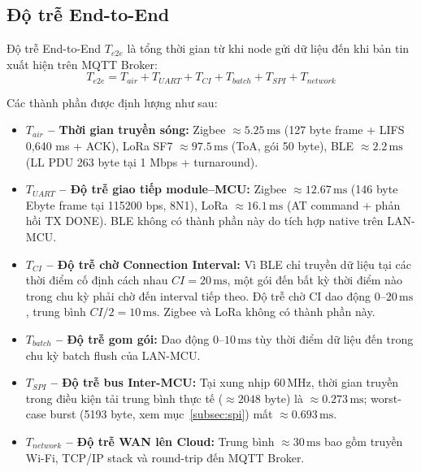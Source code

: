         \subsection{Độ trễ End-to-End}
        
        Độ trễ End-to-End $T_{e2e}$ là tổng thời gian từ khi node gửi dữ liệu đến khi bản tin xuất hiện trên MQTT Broker:
        \begin{equation}
            T_{e2e} = T_{air} + T_{UART} + T_{CI} + T_{batch} + T_{SPI} + T_{network}    
        \end{equation}
        
        
        Các thành phần được định lượng như sau:
        
        \begin{itemize}
            \item \textbf{$T_{air}$ -- Thời gian truyền sóng:} Zigbee $\approx 5{.}25\,\text{ms}$ (127 byte frame + LIFS 0,640 ms + ACK), LoRa SF7 $\approx 97{.}5\,\text{ms}$ (ToA, gói 50 byte), BLE $\approx 2{.}2\,\text{ms}$ (LL PDU 263 byte tại 1 Mbps + turnaround).
            \item \textbf{$T_{UART}$ -- Độ trễ giao tiếp module--MCU:} Zigbee $\approx 12{.}67\,\text{ms}$ (146 byte Ebyte frame tại 115200 bps, 8N1), LoRa $\approx 16{.}1\,\text{ms}$ (AT command + phản hồi TX DONE). BLE không có thành phần này do tích hợp native trên LAN-MCU.
            \item \textbf{$T_{CI}$ -- Độ trễ chờ Connection Interval:} Vì BLE chỉ truyền dữ liệu tại các thời điểm cố định cách nhau $CI = 20\,\text{ms}$, một gói đến bất kỳ thời điểm nào trong chu kỳ phải chờ đến interval tiếp theo. Độ trễ chờ CI dao động $0$--$20\,\text{ms}$, trung bình $CI/2 = 10\,\text{ms}$. Zigbee và LoRa không có thành phần này.
            \item \textbf{$T_{batch}$ -- Độ trễ gom gói:} Dao động $0$--$10\,\text{ms}$ tùy thời điểm dữ liệu đến trong chu kỳ batch flush của LAN-MCU.
            \item \textbf{$T_{SPI}$ -- Độ trễ bus Inter-MCU:} Tại xung nhịp 60\,MHz, thời gian truyền trong điều kiện tải trung bình thực tế ($\approx 2048$ byte) là $\approx 0{.}273\,\text{ms}$; worst-case burst (5193 byte, xem mục~\ref{subsec:spi}) mất $\approx 0{.}693\,\text{ms}$.
            \item \textbf{$T_{network}$ -- Độ trễ WAN lên Cloud:} Trung bình $\approx 30\,\text{ms}$ bao gồm truyền Wi-Fi, TCP/IP stack và round-trip đến MQTT Broker.
        \end{itemize}
        
